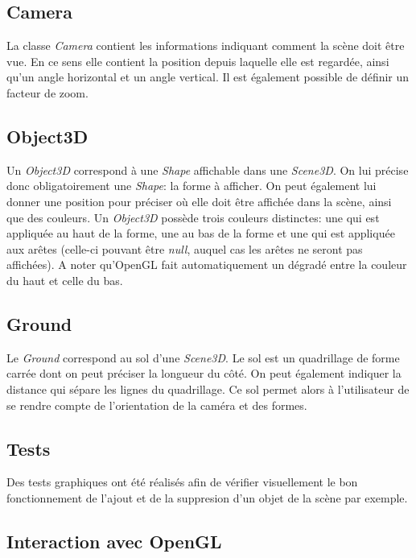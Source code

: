 \documentclass[11pt]{report}
\begin{document}
\subsection{Camera}

La classe \textit{Camera} contient les informations indiquant comment la scène doit être vue. En ce sens elle contient la position depuis laquelle elle est regardée, ainsi qu'un angle horizontal et un angle vertical. Il est également possible de définir un facteur de zoom.

\subsection{Object3D}

Un \textit{Object3D} correspond à une \textit{Shape} affichable dans une \textit{Scene3D}. On lui précise donc obligatoirement une \textit{Shape}: la forme à afficher. On peut également lui donner une position pour préciser où elle doit être affichée dans la scène, ainsi que des couleurs. Un \textit{Object3D} possède trois couleurs distinctes: une qui est appliquée au haut de la forme, une au bas de la forme et une qui est appliquée aux arêtes (celle-ci pouvant être \textit{null}, auquel cas les arêtes ne seront pas affichées). A noter qu'OpenGL fait automatiquement un dégradé entre la couleur du haut et celle du bas.

\subsection{Ground}

Le \textit{Ground} correspond au sol d'une \textit{Scene3D}. Le sol est un quadrillage de forme carrée dont on peut préciser la longueur du côté. On peut également indiquer la distance qui sépare les lignes du quadrillage. Ce sol permet alors à l'utilisateur de se rendre compte de l'orientation de la caméra et des formes.

\subsection{Tests}
Des tests graphiques ont été réalisés afin de vérifier visuellement le bon fonctionnement de l'ajout et de la suppresion d'un objet de la scène par exemple.

\subsection{Interaction avec OpenGL}
\end{document}

